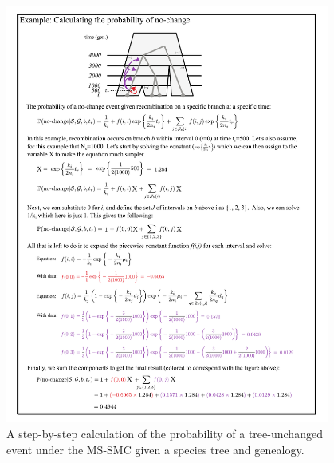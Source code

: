 \documentclass[11pt]{article}
\begin{document}
\begin{figure}[p]
	\centering
	\includegraphics[width=0.95\textwidth]{figures/current/FigS6-equations}
	\caption{A step-by-step calculation of the probability of a tree-unchanged 
	event under the MS-SMC given a species tree and genealogy.
	}
	\label{fig:figS-tree-equations}
\end{figure}
\end{document}
